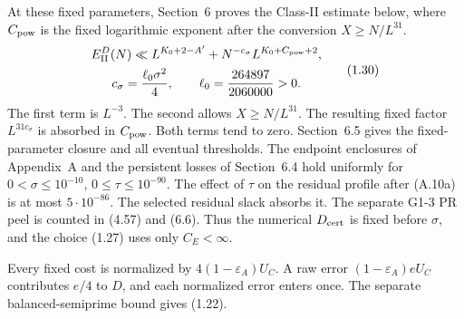 At these fixed parameters, Section~6 proves
the Class-II estimate below, where $C_{\rm pow}$ is the fixed logarithmic
exponent after the conversion $X\ge N/L^{31}$.
\[
 \begin{gathered}
 E_{\rm II}^D(N)\ll
 L^{K_0+2-A'}
 +N^{-c_\sigma}L^{K_0+C_{\rm pow}+2},\\
 c_\sigma=\frac{\ell_0\sigma^2}{4},\qquad
 \ell_0=\frac{264897}{2060000}>0.
 \end{gathered}                                             \tag{1.30}
\]
The first term is $L^{-3}$.
The second allows $X\ge N/L^{31}$.
The resulting fixed factor $L^{31c_\sigma}$ is absorbed in $C_{\rm pow}$.
Both terms tend to zero.
Section~6.5 gives the fixed-parameter closure and all eventual thresholds.
The endpoint enclosures of Appendix~A and the persistent losses of Section~6.4 hold uniformly for
$0<\sigma\le10^{-10}$, $0\le\tau\le10^{-90}$.
The effect of $\tau$ on the residual profile after (A.10a) is at most $5\cdot10^{-86}$.
The selected residual slack absorbs it.
The separate G1-3 PR peel is counted in (4.57) and (6.6).
Thus the numerical $D_{\rm cert}$ is fixed before $\sigma$,
and the choice (1.27) uses only $C_E<\infty$.

Every fixed cost is normalized by $4(1-\varepsilon_A)U_C$.
A raw error $(1-\varepsilon_A)eU_C$ contributes $e/4$ to $D$,
and each normalized error enters once.
The separate balanced-semiprime bound gives (1.22).
